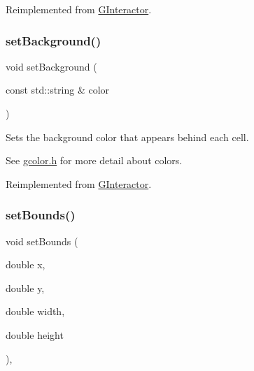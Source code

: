 Reimplemented from \mbox{\hyperlink{classGInteractor_acba7e546c2025c0a15ca4b4cc92043db}{G\+Interactor}}.

\mbox{\label{classGTable_a222fcfb542aa6094c7e0de671bd69627}} 
\subsubsection{\texorpdfstring{set\+Background()}{setBackground()}\hspace{0.1cm}{\footnotesize\ttfamily [2/2]}}
{\footnotesize\ttfamily void set\+Background (\begin{DoxyParamCaption}\item[{const std\+::string \&}]{color }\end{DoxyParamCaption})\hspace{0.3cm}{\ttfamily [virtual]}}



Sets the background color that appears behind each cell. 

See \mbox{\hyperlink{gcolor_8h_source}{gcolor.\+h}} for more detail about colors. 

Reimplemented from \mbox{\hyperlink{classGInteractor_ab4677ab2474e68b07aa56605af92a84a}{G\+Interactor}}.

\mbox{\label{classGInteractor_a2aae8197624b72265ab83b4f1bc73f2f}} 
\subsubsection{\texorpdfstring{set\+Bounds()}{setBounds()}\hspace{0.1cm}{\footnotesize\ttfamily [1/2]}}
{\footnotesize\ttfamily void set\+Bounds (\begin{DoxyParamCaption}\item[{double}]{x,  }\item[{double}]{y,  }\item[{double}]{width,  }\item[{double}]{height }\end{DoxyParamCaption})\hspace{0.3cm}{\ttfamily [virtual]}, {\ttfamily [inherited]}}



